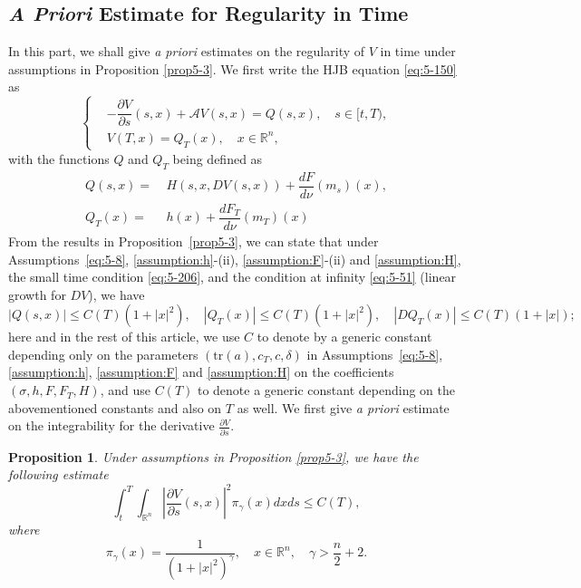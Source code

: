 \documentclass[11pt]{article}
\numberwithin{equation}{section}
\newtheorem{proposition}[theorem]{Proposition}
\newcommand{\dd}{\partial}
\newcommand{\brn}{{\mathbb{R}^n}}
\newcommand{\1}{\mbox{1\hspace{-1mm}I}}
\begin{document}
\subsection{\textit{A Priori} Estimate for Regularity in Time}

In this part, we shall give \textit{a priori} estimates on the regularity of $V$ in time under assumptions in Proposition \ref{prop5-3}. We first write the HJB equation \eqref{eq:5-150} as 
\begin{equation}\label{eq:5-53}
    \left\{
    \begin{aligned}
        &-\dfrac{\partial V}{\partial s}(s,x)+\mathcal{A}V(s,x)=Q(s,x),\quad s\in[t,T),\\
        &V(T,x)=Q_{T}(x),\quad x\in\brn,
    \end{aligned}
    \right.
\end{equation}
with the functions $Q$ and $Q_T$ being defined as
\begin{equation*}\label{eq:5-54}
    \begin{aligned}
        Q(s,x)=\ & H(s,x,DV(s,x))+\dfrac{dF}{d\nu}\left(m_s\right)(x),\\
        Q_{T}(x)=\ & h(x)+\dfrac{dF_{T}}{d\nu}\left(m_T\right)(x)
    \end{aligned}
\end{equation*}
From the results in Proposition~\ref{prop5-3}, we can state that under Assumptions~\ref{eq:5-8}, \ref{assumption:h}-(ii), \ref{assumption:F}-(ii) and \ref{assumption:H}, the small time condition \eqref{eq:5-206}, and the condition at infinity \eqref{eq:5-51} (linear growth for $DV$), we have
\begin{equation}\label{eq:5-55}
    |Q(s,x)|\le C(T)\left(1+|x|^{2}\right),\quad \left|Q_{T}(x)\right|\le C(T)\left(1+|x|^{2}\right),\quad \left|DQ_{T}(x)\right|\le C(T)(1+|x|);
\end{equation}
here and in the rest of this article, we use $C$ to denote by a generic constant depending only on the parameters $\left(\text{tr}(a),c_T,c,\delta\right)$ in Assumptions~\ref{eq:5-8}, \ref{assumption:h}, \ref{assumption:F} and \ref{assumption:H} on the coefficients $\left(\sigma,h,F,F_T,H\right)$, and use $C(T)$ to denote a generic constant depending on the abovementioned constants and also on $T$ as well. We first give \textit{a priori} estimate on the integrability for the derivative $\frac{\dd V}{\dd s}$. 

\begin{proposition}\label{prop5-4}
Under assumptions in Proposition \ref{prop5-3}, we have the following estimate 
\begin{equation}\label{eq:5-56}
    \int_{t}^{T}\int_{\brn}\left|\dfrac{\partial V}{\partial s}(s,x)\right|^{2}\pi_{\gamma}(x)dxds\le C(T),
\end{equation}
where 
\begin{equation}\label{eq:5-100}
    \pi_{\gamma}(x)=\dfrac{1}{\left(1+|x|^{2}\right)^{\gamma}},\quad x\in\brn,\quad \gamma>\dfrac{n}{2}+2.
\end{equation}
\end{proposition}
\end{document}
